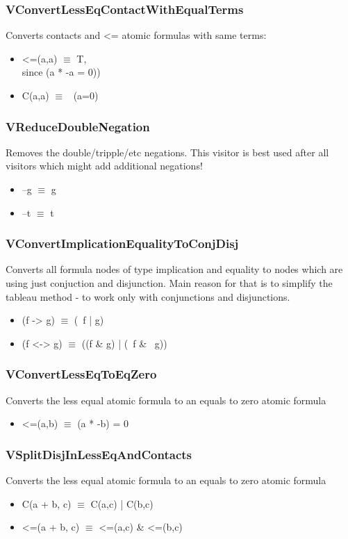 \documentclass{article}
\begin{document}
				\subsubsection*{VConvertLessEqContactWithEqualTerms}
					Converts contacts and <= atomic formulas with same terms:
					\begin{itemize}
						\item <=(a,a) $\equiv$ T, \\
							since (a * -a = 0))
						\item C(a,a) $\equiv$ ~(a=0)
					\end{itemize}
				\subsubsection*{VReduceDoubleNegation}
					Removes the double/tripple/etc negations. 
					This visitor is best used after all visitors which might add additional negations!
					\begin{itemize}
						\item --g $\equiv$ g
						\item --t $\equiv$ t
					\end{itemize}
				\subsubsection{VConvertImplicationEqualityToConjDisj}
					Converts all formula nodes of type implication and equality to nodes 
					which are using just conjuction and disjunction. 
					Main reason for that is to simplify the tableau method - 
					to work only with conjunctions and disjunctions.
					\begin{itemize}
						\item (f -> g)  $\equiv$ (~f | g)
						\item (f <-> g) $\equiv$ ((f \& g) | (~f \& ~g))
					\end{itemize}
				\subsubsection*{VConvertLessEqToEqZero}
					Converts the less equal atomic formula to an equals to zero atomic formula
					\begin{itemize}
						\item <=(a,b) $\equiv$ (a * -b) = 0
					\end{itemize}
				\subsubsection*{VSplitDisjInLessEqAndContacts}
					Converts the less equal atomic formula to an equals to zero atomic formula
					\begin{itemize}
						\item C(a + b, c) $\equiv$ C(a,c) | C(b,c)
						\item <=(a + b, c) $\equiv$ <=(a,c) \& <=(b,c)
					\end{itemize}
\end{document}
